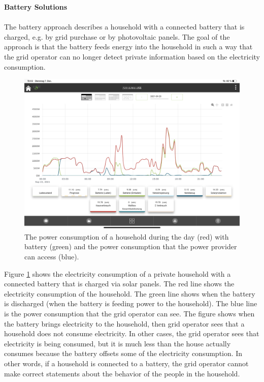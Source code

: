 \textbf{Battery Solutions}
\\
\\
The battery approach describes a household with a connected battery that is charged, e.g. by grid purchase or by photovoltaic panels. The goal of the approach is that the battery feeds energy into the household in such a way that the grid operator can no longer detect private information based on the electricity consumption. \\
\begin{figure}[tbp]
  \centering
  \includegraphics[width=1\textwidth]{images/Battery.jpg}
  \caption[Battery Consumption Figure]{The power consumption of a household during the day (red) with battery (green) and the power consumption that the power provider can access (blue).}
  \label{fig:Battery}
\end{figure}
Figure \ref{fig:Battery} shows the electricity consumption of a private household with a connected battery that is charged via solar panels. The red line shows the electricity consumption of the household. The green line shows when the battery is discharged (when the battery is feeding power to the household). The blue line is the power consumption that the grid operator can see. The figure shows when the battery brings electricity to the household, then grid operator sees that a household does not consume electricity. In other cases, the grid operator sees that electricity is being consumed, but it is much less than the house actually consumes because the battery offsets some of the electricity consumption. In other words, if a household is connected to a battery, the grid operator cannot make correct statements about the behavior of the people in the household. \\
